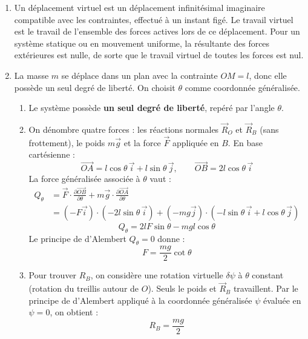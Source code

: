 \documentclass[12pt,a4paper]{article}
\begin{document}
\begin{boitecorrige}
\begin{enumerate}
  \item Un déplacement virtuel est un déplacement infinitésimal imaginaire compatible avec les contraintes, effectué à un instant figé. Le travail virtuel est le travail de l'ensemble des forces actives lors de ce déplacement. Pour un système statique ou en mouvement uniforme, la résultante des forces extérieures est nulle, de sorte que le travail virtuel de toutes les forces est nul.

  \item La masse $m$ se déplace dans un plan avec la contrainte $OM = l$, donc elle possède un seul degré de liberté. On choisit $\theta$ comme coordonnée généralisée.

  \begin{enumerate}
    \item[a)] Le système possède \textbf{un seul degré de liberté}, repéré par l'angle $\theta$.

    \item[b)] On dénombre quatre forces : les réactions normales $\vec{R}_O$ et $\vec{R}_B$ (sans frottement), le poids $m\vec{g}$ et la force $\vec{F}$ appliquée en $B$. En base cartésienne :
    \[
      \overrightarrow{OA} = l\cos\theta\,\vec{i} + l\sin\theta\,\vec{j}, \qquad
      \overrightarrow{OB} = 2l\cos\theta\,\vec{i}
    \]
    La force généralisée associée à $\theta$ vaut :
    \begin{align*}
      Q_\theta &= \vec{F}\cdot\frac{\partial\overrightarrow{OB}}{\partial\theta} + m\vec{g}\cdot\frac{\partial\overrightarrow{OA}}{\partial\theta}\\
              &= (-F\vec{i})\cdot(-2l\sin\theta\,\vec{i}) + (-mg\vec{j})\cdot(-l\sin\theta\,\vec{i}+l\cos\theta\,\vec{j})
    \end{align*}
    \[
      Q_\theta = 2lF\sin\theta - mgl\cos\theta
    \]
    Le principe de d'Alembert $Q_\theta = 0$ donne :
    \[
      \boxed{F = \frac{mg}{2}\cot\theta}
    \]

    \item[c)] Pour trouver $R_B$, on considère une rotation virtuelle $\delta\psi$ à $\theta$ constant (rotation du treillis autour de $O$). Seuls le poids et $\vec{R}_B$ travaillent. Par le principe de d'Alembert appliqué à la coordonnée généralisée $\psi$ évaluée en $\psi=0$, on obtient :
    \[
      \boxed{R_B = \frac{mg}{2}}
    \]
  \end{enumerate}
\end{enumerate}
\end{boitecorrige}
\end{document}
